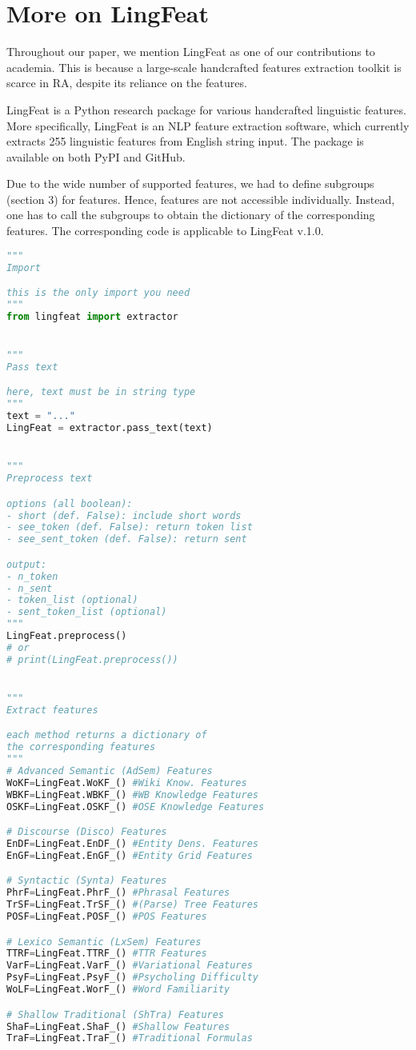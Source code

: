 \documentclass[11pt]{article}
\begin{document}
\section{More on LingFeat}
Throughout our paper, we mention LingFeat as one of our contributions to academia. This is because a large-scale handcrafted features extraction toolkit is scarce in RA, despite its reliance on the features. 

LingFeat is a Python research package for various handcrafted linguistic features. More specifically, LingFeat is an NLP feature extraction software, which currently extracts 255 linguistic features from English string input. The package is available on both PyPI and GitHub. 

Due to the wide number of supported features, we had to define subgroups (section 3) for features. Hence, features are not accessible individually. Instead, one has to call the subgroups to obtain the dictionary of the corresponding features. The corresponding code is applicable to LingFeat v.1.0.

\newpage
\begin{lstlisting}[language=Python, basicstyle=\fontsize{8}{10}\selectfont\ttfamily]
"""
Import

this is the only import you need
"""
from lingfeat import extractor


"""
Pass text

here, text must be in string type
"""
text = "..."
LingFeat = extractor.pass_text(text)


"""
Preprocess text

options (all boolean):
- short (def. False): include short words
- see_token (def. False): return token list
- see_sent_token (def. False): return sent

output:
- n_token
- n_sent
- token_list (optional)
- sent_token_list (optional)
"""
LingFeat.preprocess()
# or
# print(LingFeat.preprocess())


"""
Extract features

each method returns a dictionary of 
the corresponding features
"""
# Advanced Semantic (AdSem) Features
WoKF=LingFeat.WoKF_() #Wiki Know. Features
WBKF=LingFeat.WBKF_() #WB Knowledge Features
OSKF=LingFeat.OSKF_() #OSE Knowledge Features

# Discourse (Disco) Features
EnDF=LingFeat.EnDF_() #Entity Dens. Features
EnGF=LingFeat.EnGF_() #Entity Grid Features

# Syntactic (Synta) Features
PhrF=LingFeat.PhrF_() #Phrasal Features
TrSF=LingFeat.TrSF_() #(Parse) Tree Features
POSF=LingFeat.POSF_() #POS Features

# Lexico Semantic (LxSem) Features
TTRF=LingFeat.TTRF_() #TTR Features
VarF=LingFeat.VarF_() #Variational Features
PsyF=LingFeat.PsyF_() #Psycholing Difficulty 
WoLF=LingFeat.WorF_() #Word Familiarity

# Shallow Traditional (ShTra) Features
ShaF=LingFeat.ShaF_() #Shallow Features 
TraF=LingFeat.TraF_() #Traditional Formulas 
\end{lstlisting}
\end{document}
